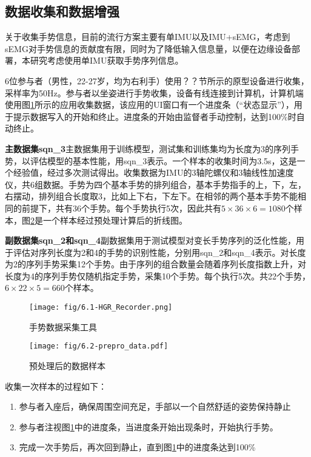 \subsection{数据收集和数据增强}\label{ssec:data_clct}

关于收集手势信息，目前的流行方案主要有单IMU以及IMU+sEMG，考虑到sEMG对手势信息的贡献度有限\cite{li2022research}，同时为了降低输入信息量，以便在边缘设备部署，本研究考虑使用单IMU获取手势序列信息。

6位参与者（男性，22-27岁，均为右利手）使用？？节所示的原型设备进行收集，采样率为50Hz。参与者以坐姿进行手势收集，设备有线连接到计算机，计算机端使用图\ref{fig:HGR_Recorder}所示的应用收集数据，该应用的UI窗口有一个进度条（“状态显示”），用于提示数据写入的开始和终止。进度条的开始由监督者手动控制，达到100\%时自动终止。

\textbf{主数据集sqn\_3}\hspace{5pt}主数据集用于训练模型，测试集和训练集均为长度为3的序列手势，以评估模型的基本性能，用sqn\_3表示。一个样本的收集时间为3.5s，这是一个经验值，经过多次测试得出。收集数据为IMU的3轴陀螺仪和3轴线性加速度仪，共6组数据。手势为四个基本手势的排列组合，基本手势指手的上，下，左，右摆动，排列组合长度取3，比如上下右，下左下。在相邻的两个基本手势不能相同的前提下，共有36个手势。每个手势执行5次，因此共有$5\times 36\times 6 = 1080$个样本，图\ref{fig:6.2-pre_pro_data}是一个样本经过预处理计算后的折线图。

\textbf{副数据集sqn\_2和sqn\_4}\hspace{5pt}副数据集用于测试模型对变长手势序列的泛化性能，用于评估对序列长度为2和4的手势的识别性能，分别用sqn\_2和sqn\_4表示。对长度为2的序列手势采集12个手势。由于序列的组合数量会随着序列长度指数上升，对长度为4的序列手势仅随机指定手势，采集10个手势。每个执行5次。共22个手势，$6\times 22\times 5=660$个样本。

\begin{figure}[t]
    \centering
    \texttt{[image: fig/6.1-HGR\_Recorder.png]}
    \caption{手势数据采集工具}
    \label{fig:HGR_Recorder}
\end{figure}

\begin{figure}[t]
    \centering
    \texttt{[image: fig/6.2-prepro\_data.pdf]}
    \caption{预处理后的数据样本}
    \label{fig:6.2-pre_pro_data}
\end{figure}

收集一次样本的过程如下：

\begin{enumerate}
    \item 参与者入座后，确保周围空间充足，手部以一个自然舒适的姿势保持静止
    \item 参与者注视图\ref{fig:HGR_Recorder}中的进度条，当进度条开始出现条时，开始执行手势。
    \item 完成一次手势后，再次回到静止，直到图\ref{fig:HGR_Recorder}中的进度条达到100\%
\end{enumerate}

